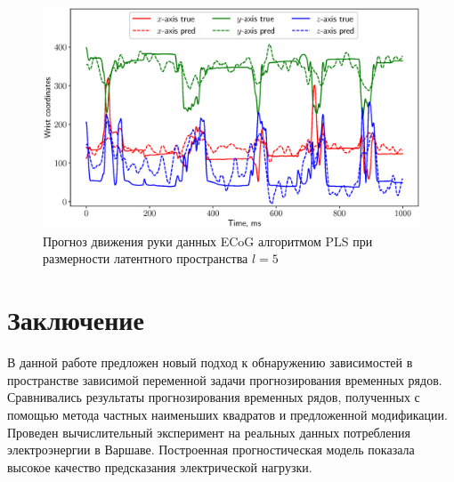 \documentclass[12pt,twoside]{article}
\begin{document}
\begin{figure}[!h]
	\centering
	\includegraphics[width=\textwidth]{figs/ecog_prediction}
	\caption{Прогноз движения руки данных ECoG алгоритмом PLS при размерности латентного пространства $l=5$}
	\label{fig::ecog_prediction}
\end{figure}

\section{Заключение}
В данной работе предложен новый подход к обнаружению зависимостей в пространстве зависимой переменной задачи прогнозирования временных рядов. Сравнивались результаты прогнозирования временных рядов, полученных с помощью метода частных наименьших квадратов и предложенной модификации. Проведен вычислительный эксперимент на реальных данных потребления электроэнергии в Варшаве. Построенная прогностическая модель показала высокое качество предсказания электрической нагрузки. 




\end{document}
